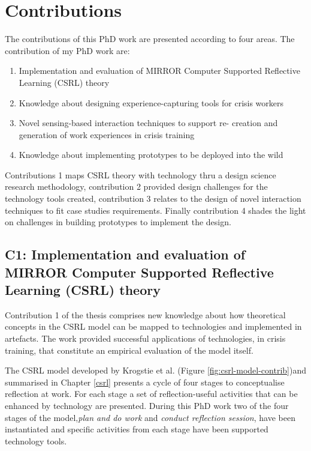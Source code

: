 \chapter{Contributions}\label{contributions}


The contributions of this PhD work are presented according to four
areas. The contribution of my PhD work are:

\begin{enumerate}
\def\labelenumi{\arabic{enumi}.}
\itemsep1pt\parskip0pt
\item
  Implementation and evaluation of MIRROR Computer Supported Reflective
  Learning (CSRL) theory
\item
  Knowledge about designing experience-capturing tools for crisis
  workers
\item
  Novel sensing-based interaction techniques to support re- creation and
  generation of work experiences in crisis training
\item
  Knowledge about implementing prototypes to be deployed into the wild
\end{enumerate}

Contributions 1 maps CSRL theory with technology thru a design science
research methodology, contribution 2 provided design challenges for the
technology tools created, contribution 3 relates to the design of novel
interaction techniques to fit case studies requirements. Finally
contribution 4 shades the light on challenges in building prototypes to
implement the design.

\section{C1: Implementation and evaluation of MIRROR Computer Supported
Reflective Learning (CSRL)
theory}\label{c1-implementation-and-evaluation-of-mirror-computer-supported-reflective-learning-csrl-theory}

Contribution 1 of the thesis comprises new knowledge about how
theoretical concepts in the CSRL model can be mapped to technologies and
implemented in artefacts. The work provided successful applications of
technologies, in crisis training, that constitute an empirical
evaluation of the model itself.

The CSRL model developed by Krogstie et al. \autocite*{Krogstie:2013kf}
(Figure \ref{fig:csrl-model-contrib})and summarised in Chapter
\ref{csrl} presents a cycle of four stages to conceptualise reflection
at work. For each stage a set of reflection-useful activities that can
be enhanced by technology are presented. During this PhD work two of the
four stages of the model,\emph{plan and do work} and \emph{conduct
reflection session}, have been instantiated and specific activities from
each stage have been supported technology tools.

